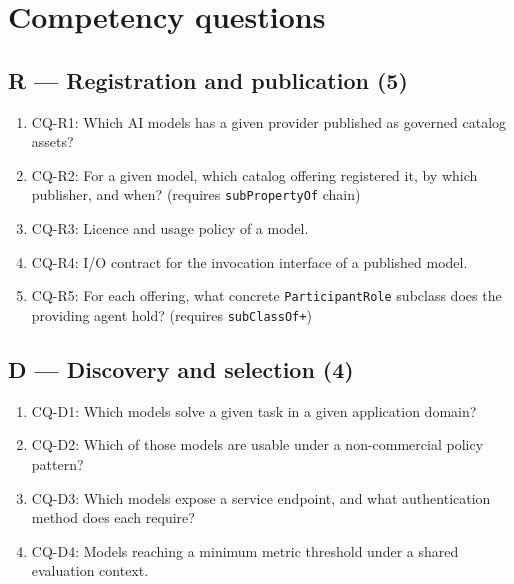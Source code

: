 \documentclass[Afour,sagev,times]{sagej}
\newcommand{\code}[1]{\texttt{#1}}
\newcommand{\cq}[1]{\textsf{#1}}
\begin{document}
\section{Competency questions}\label{app:cqs}

\subsection*{R --- Registration and publication (5)}
\begin{enumerate}[label=\arabic*., leftmargin=*]
\item \cq{CQ-R1}: Which AI models has a given provider published as governed catalog assets?
\item \cq{CQ-R2}: For a given model, which catalog offering registered it, by which publisher, and when? (requires \code{subPropertyOf} chain)
\item \cq{CQ-R3}: Licence and usage policy of a model.
\item \cq{CQ-R4}: I/O contract for the invocation interface of a published model.
\item \cq{CQ-R5}: For each offering, what concrete \code{ParticipantRole} subclass does the providing agent hold? (requires \code{subClassOf+})
\end{enumerate}

\subsection*{D --- Discovery and selection (4)}
\begin{enumerate}[label=\arabic*., leftmargin=*]
\item \cq{CQ-D1}: Which models solve a given task in a given application domain?
\item \cq{CQ-D2}: Which of those models are usable under a non-commercial policy pattern?
\item \cq{CQ-D3}: Which models expose a service endpoint, and what authentication method does each require?
\item \cq{CQ-D4}: Models reaching a minimum metric threshold under a shared evaluation context.
\end{enumerate}
\end{document}
